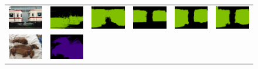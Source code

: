 \begin{figure}[!htbp]
  \centering
  \scalebox{0.82} {
  \begin{tabular}{c c c c c c}
    \includegraphics[height=0.11\linewidth]{fig/val_crf_vis/img/2007_000042.jpg} &
    \includegraphics[height=0.11\linewidth]{fig/val_crf_vis/adaweak/2007_000042.png} &
    \includegraphics[height=0.11\linewidth]{fig/val_crf_vis/bbox/2007_000042.png} &
    \includegraphics[height=0.11\linewidth]{fig/val_crf_vis/bbox_crf/2007_000042.png} &
    \includegraphics[height=0.11\linewidth]{fig/val_crf_vis/strongweak/2007_000042.png} &
    \includegraphics[height=0.11\linewidth]{fig/val_crf_vis/cocomix/2007_000042.png} \\
    \includegraphics[height=0.122\linewidth]{fig/val_crf_vis/img/2007_002852.jpg} &
    \includegraphics[height=0.122\linewidth]{fig/val_crf_vis/adaweak/2007_002852.png} &

\end{tabular}}
\end{figure}

